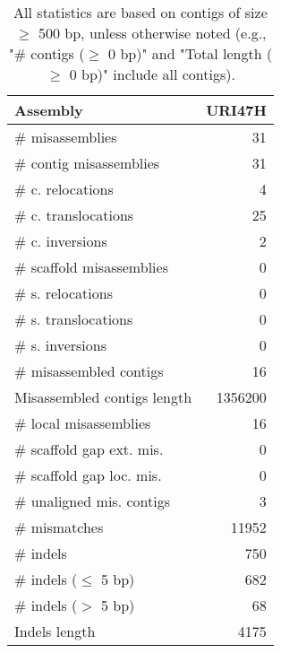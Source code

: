 \documentclass[12pt,a4paper]{article}
\begin{document}
\begin{table}[ht]
\begin{center}
\caption{All statistics are based on contigs of size $\geq$ 500 bp, unless otherwise noted (e.g., "\# contigs ($\geq$ 0 bp)" and "Total length ($\geq$ 0 bp)" include all contigs).}
\begin{tabular}{|l*{1}{|r}|}
\hline
Assembly & URI47H \\ \hline
\# misassemblies & 31 \\ \hline
\hspace{2mm}\# contig misassemblies & 31 \\ \hline
\hspace{5mm}\# c. relocations & 4 \\ \hline
\hspace{5mm}\# c. translocations & 25 \\ \hline
\hspace{5mm}\# c. inversions & 2 \\ \hline
\hspace{2mm}\# scaffold misassemblies & 0 \\ \hline
\hspace{5mm}\# s. relocations & 0 \\ \hline
\hspace{5mm}\# s. translocations & 0 \\ \hline
\hspace{5mm}\# s. inversions & 0 \\ \hline
\# misassembled contigs & 16 \\ \hline
Misassembled contigs length & 1356200 \\ \hline
\# local misassemblies & 16 \\ \hline
\# scaffold gap ext. mis. & 0 \\ \hline
\# scaffold gap loc. mis. & 0 \\ \hline
\# unaligned mis. contigs & 3 \\ \hline
\# mismatches & 11952 \\ \hline
\# indels & 750 \\ \hline
\hspace{5mm}\# indels ($\leq$ 5 bp) & 682 \\ \hline
\hspace{5mm}\# indels ($>$ 5 bp) & 68 \\ \hline
Indels length & 4175 \\ \hline
\end{tabular}
\end{center}
\end{table}
\end{document}
